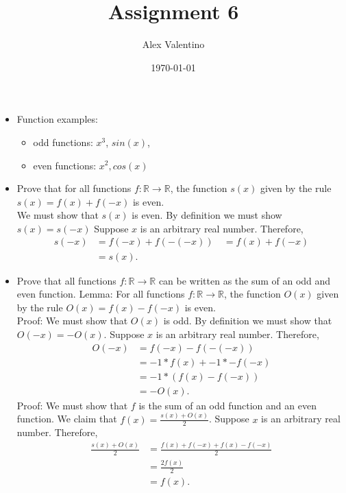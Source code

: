 \documentclass[12pt, letterpaper]{article}
\date{\today}
\author{Alex Valentino}
\title{Assignment 6}
\newcommand{\R}{\mathbb{R}}
\begin{document}
	\begin{itemize}
		\item Function examples:\\
			\begin{itemize}
				\item odd functions: $x^3$, $sin(x)$,
				\item even functions: $x^2, cos(x)$
			\end{itemize}
		\item Prove that for all functions $f: \R \to \R$, the function $s(x)$ given by the rule $s(x) = f(x) + f(-x)$ is even.  \\
		We must show that $s(x)$ is even.  By definition we must show $s(x) = s(-x)$  Suppose $x$ is an arbitrary real number.  Therefore, \begin{align*}
			s(-x) &= f(-x) + f(-(-x))\
			&= f(x) + f(-x)\\
			&= s(x).
		\end{align*}
		\item Prove that all functions $f: \R \to \R$ can be written as the sum of an odd and even function.  
		Lemma: For all functions $f:\R \to \R$, the function $O(x)$ given by the rule $O(x) = f(x)-f(-x)$ is even.  \\
		Proof: We must show that $O(x)$ is odd.  By definition we must show that $O(-x) = -O(x).$  Suppose $x$ is an arbitrary real number.  Therefore, \begin{align*}
		O(-x) &= f(-x) - f(-(-x))\\
		 &= -1*f(x) + -1*-f(-x)\\ 
		 &= -1*(f(x)-f(-x))\\ 
		 &= -O(x).
		\end{align*}
		Proof: We must show that $f$ is the sum of an odd function and an even function.  We claim that $f(x) = \frac{s(x) + O(x)}{2}$.  Suppose $x$ is an arbitrary real number.  Therefore, 
		\begin{align*}
			\frac{s(x) + O(x)}{2} &= \frac{f(x) + f(-x) + f(x) - f(-x)}{2}\\
			&= \frac{2f(x)}{2}\\
			&= f(x).
		\end{align*}			
	\end{itemize}
\end{document}
